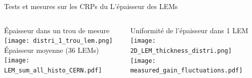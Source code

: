     \begin{frame}{Tests et mesures sur les CRPs du \SSS{}}{L'épaisseur des LEMs}
    	\begin{scriptsize}
    		\begin{columns}
    			\begin{column}{0.48\textwidth}
    				\centering
    				Épaisseur dans un trou de mesure\\
    				\centering
    				\texttt{[image: distri\_1\_trou\_lem.png]}\\
    				\vspace{0.15cm}
    				\centering
    				Épaisseur moyenne (36 LEMs)\\
    				\texttt{[image: LEM\_sum\_all\_histo\_CERN.pdf]}
    			\end{column}
    			\hfill
    			\begin{column}{0.48\textwidth}
    				\centering
    				Uniformité de l'épaisseur dans 1 LEM\\
    				\centering
    				\texttt{[image: 2D\_LEM\_thickness\_distri.png]}\\
    				\vspace{0.15cm}
    				\centering
    				\texttt{[image: measured\_gain\_fluctuations.pdf]}
    			\end{column}
    		\end{columns}
    	\end{scriptsize}
    \end{frame}



